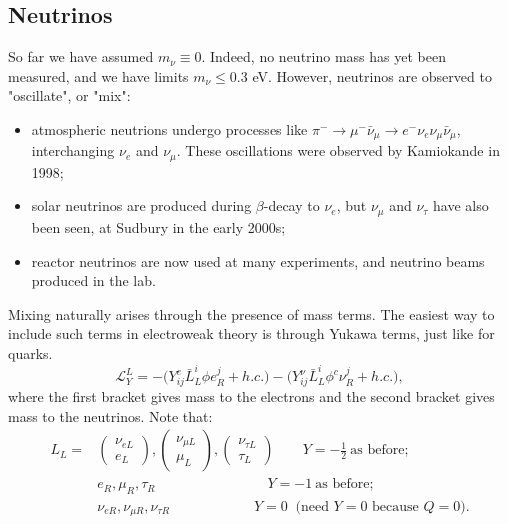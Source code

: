 \subsection{Neutrinos}
%
So far we have assumed $m_\nu \equiv 0$. Indeed, no neutrino mass has yet been measured, and we have limits $m_\nu \leq 0.3$ eV. However, neutrinos are observed to "oscillate", or "mix":
\begin{itemize}
\item atmospheric neutrions undergo processes like $\pi^- \to \mu^- \bar{\nu}_\mu \to e^- \nu_e \nu_\mu \bar{\nu}_\mu$, interchanging $\nu_e$ and $\nu_\mu$. These oscillations were observed by Kamiokande in 1998;
\item solar neutrinos are produced during $\beta$-decay to $\nu_e$, but $\nu_\mu$ and $\nu_\tau$ have also been seen, at Sudbury in the early 2000s;
\item reactor neutrinos are now used at many experiments, and neutrino beams produced in the lab.
\end{itemize}
Mixing naturally arises through the presence of mass terms. The easiest way to include such terms in electroweak theory is through Yukawa terms, just like for quarks.
\begin{equation}
\mathcal{L}^L_{Y} = - \bigg(Y_{ij}^e \bar{L}_L^i \phi e_R^j + h.c. \bigg) - \bigg(Y_{ij}^\nu \bar{L}_L^i \phi^c \nu_R^j + h.c. \bigg),
\end{equation}
where the first bracket gives mass to the electrons and the second bracket gives mass to the neutrinos. Note that:
\begin{equation}
\begin{split}
L_L = &\begin{pmatrix} \nu_{eL} \\ e_L \end{pmatrix}, 
\begin{pmatrix} \nu_{\mu L} \\ \mu_L \end{pmatrix},
\begin{pmatrix} \nu_{\tau L} \\ \tau_L \end{pmatrix}
\qquad Y=-\frac{1}{2} \ \text{as before}; \\
&e_R, \mu_R, \tau_R \qquad \qquad \qquad \qquad Y=-1 \ \text{as before}; \\
&\nu_{eR}, \nu_{\mu R}, \nu_{\tau R}\qquad \qquad \qquad Y=0\ \text{ (need } Y=0 \text{ because } Q=0).
\end{split}
\end{equation}
